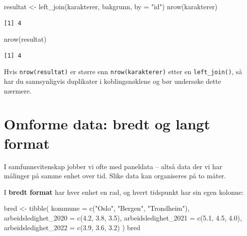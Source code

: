 \documentclass[
  norsk,
  letterpaper,
  DIV=11,
  numbers=noendperiod]{scrreprt}
\newenvironment{Shaded}{\begin{snugshade}}{\end{snugshade}}
\newcommand{\AttributeTok}[1]{\textcolor[rgb]{0.40,0.45,0.13}{#1}}
\newcommand{\FloatTok}[1]{\textcolor[rgb]{0.68,0.00,0.00}{#1}}
\newcommand{\FunctionTok}[1]{\textcolor[rgb]{0.28,0.35,0.67}{#1}}
\newcommand{\NormalTok}[1]{\textcolor[rgb]{0.00,0.23,0.31}{#1}}
\newcommand{\OtherTok}[1]{\textcolor[rgb]{0.00,0.23,0.31}{#1}}
\newcommand{\StringTok}[1]{\textcolor[rgb]{0.13,0.47,0.30}{#1}}
\theoremstyle{definition}
\theoremstyle{remark}
\begin{document}
\begin{Shaded}
\begin{Highlighting}[]
\NormalTok{resultat }\OtherTok{\textless{}{-}} \FunctionTok{left\_join}\NormalTok{(karakterer, bakgrunn, }\AttributeTok{by =} \StringTok{"id"}\NormalTok{)}
\FunctionTok{nrow}\NormalTok{(karakterer)}
\end{Highlighting}
\end{Shaded}

\begin{verbatim}
[1] 4
\end{verbatim}

\begin{Shaded}
\begin{Highlighting}[]
\FunctionTok{nrow}\NormalTok{(resultat)}
\end{Highlighting}
\end{Shaded}

\begin{verbatim}
[1] 4
\end{verbatim}

Hvis \texttt{nrow(resultat)} er større enn \texttt{nrow(karakterer)}
etter en \texttt{left\_join()}, så har du sannsynligvis duplikater i
koblingsnøklene og bør undersøke dette nærmere.

\section{Omforme data: bredt og langt
format}\label{omforme-data-bredt-og-langt-format}

I samfunnsvitenskap jobber vi ofte med paneldata -- altså data der vi
har målinger på samme enhet over tid. Slike data kan organiseres på to
måter.

I \textbf{bredt format} har hver enhet en rad, og hvert tidspunkt har
sin egen kolonne:

\begin{Shaded}
\begin{Highlighting}[]
\NormalTok{bred }\OtherTok{\textless{}{-}} \FunctionTok{tibble}\NormalTok{(}
  \AttributeTok{kommune =} \FunctionTok{c}\NormalTok{(}\StringTok{"Oslo"}\NormalTok{, }\StringTok{"Bergen"}\NormalTok{, }\StringTok{"Trondheim"}\NormalTok{),}
  \AttributeTok{arbeidsledighet\_2020 =} \FunctionTok{c}\NormalTok{(}\FloatTok{4.2}\NormalTok{, }\FloatTok{3.8}\NormalTok{, }\FloatTok{3.5}\NormalTok{),}
  \AttributeTok{arbeidsledighet\_2021 =} \FunctionTok{c}\NormalTok{(}\FloatTok{5.1}\NormalTok{, }\FloatTok{4.5}\NormalTok{, }\FloatTok{4.0}\NormalTok{),}
  \AttributeTok{arbeidsledighet\_2022 =} \FunctionTok{c}\NormalTok{(}\FloatTok{3.9}\NormalTok{, }\FloatTok{3.6}\NormalTok{, }\FloatTok{3.2}\NormalTok{)}
\NormalTok{)}
\NormalTok{bred}
\end{Highlighting}
\end{Shaded}
\end{document}
